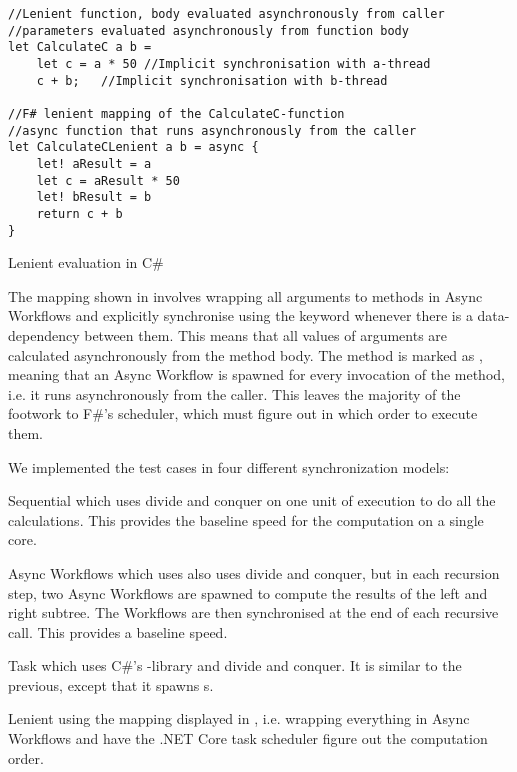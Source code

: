 \begin{listing}[H]
\begin{verbatim}
//Lenient function, body evaluated asynchronously from caller
//parameters evaluated asynchronously from function body
let CalculateC a b =
    let c = a * 50 //Implicit synchronisation with a-thread
    c + b;   //Implicit synchronisation with b-thread

//F# lenient mapping of the CalculateC-function
//async function that runs asynchronously from the caller
let CalculateCLenient a b = async {
    let! aResult = a
    let c = aResult * 50
    let! bResult = b
    return c + b
}
\end{verbatim}
\caption{Lenient evaluation in C\#} \label{lst:lenient:to:task}
\end{listing}
The mapping shown in  involves wrapping all arguments to methods in Async Workflows and explicitly synchronise using the  keyword whenever there is a data-dependency between them. This means that all values of arguments are calculated asynchronously from the method body. The method is marked as , meaning that an Async Workflow is spawned for every invocation of the method, i.e. it runs asynchronously from the caller. This leaves the majority of the footwork to F\#'s scheduler, which must figure out in which order to execute them.

We implemented the test cases in four different synchronization models:
\begin{labeling}{\quad\quad}
    \item[Sequential] which uses divide and conquer on one unit of execution to do all the calculations. This provides the baseline speed for the computation on a single core.
    \item[Async Workflows] which uses also uses divide and conquer, but in each recursion step, two Async Workflows are spawned to compute the results of the left and right subtree. The Workflows are then synchronised at the end of each recursive call. This provides a \textit{} baseline speed.
    \item[Task] which uses C\#'s -library and divide and conquer. It is similar to the previous, except that it spawns s.
    \item[Lenient] using the mapping displayed in , i.e. wrapping everything in Async Workflows and have the .NET Core task scheduler figure out the computation order.
\end{labeling}

